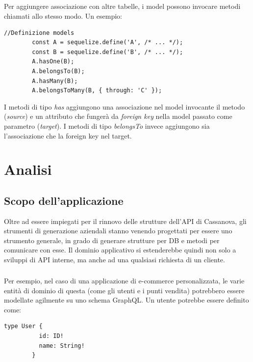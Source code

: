\documentclass[a4paper, 12pt]{report}
\begin{document}
      \paragraph*{}
      Per aggiungere associazione con altre tabelle, i model possono invocare metodi chiamati allo stesso modo. Un esempio:
      \begin{Verbatim}[samepage=true]
        //Definizione models
        const A = sequelize.define('A', /* ... */);
        const B = sequelize.define('B', /* ... */);
        A.hasOne(B);
        A.belongsTo(B);
        A.hasMany(B);
        A.belongsToMany(B, { through: 'C' });
      \end{Verbatim}
       I metodi di tipo \emph{has} aggiungono una associazione nel model invocante il metodo (\emph{source}) e un attributo che fungerà da \emph{foreign key} nella model passato come parametro (\emph{target}).
       I metodi di tipo \emph{belongsTo} invece aggiungono sia l'associazione che la foreign key nel target.
  \newpage
  \chapter{Analisi}
    \section{Scopo dell'applicazione}
      Oltre ad essere impiegati per il rinnovo delle strutture dell'API di Cassanova, gli strumenti di generazione aziendali stanno venendo progettati per essere uno strumento generale, in grado di generare strutture per DB e metodi per comunicare con esse.
      Il dominio applicativo si estenderebbe quindi non solo a sviluppi di API interne, ma anche ad una qualsiasi richiesta di un cliente.
      \paragraph*{}
      Per esempio, nel caso di una applicazione di e-commerce personalizzata, le varie entità di dominio di questa (come gli utenti e i punti vendita) potrebbero essere modellate agilmente su uno schema GraphQL.
      Un utente potrebbe essere definito come:
      \begin{Verbatim}[samepage=true]
        type User {
          id: ID!
          name: String!
        }
      \end{Verbatim}
\end{document}

